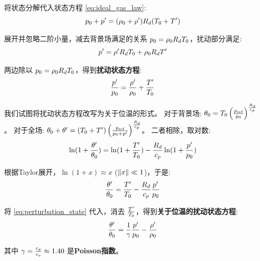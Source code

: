 将状态分解代入状态方程 \eqref{eq:ideal_gas_law}:
\begin{equation*}
    p_0 + p^\prime = (\rho_0 + \rho^\prime) R_d (T_0 + T^\prime)
\end{equation*}

展开并忽略二阶小量，减去背景场满足的关系 $p_0 = \rho_0 R_d T_0$，扰动部分满足:
\begin{equation*}
    p^\prime = \rho^\prime R_d T_0 + \rho_0 R_d T^\prime
\end{equation*}

两边除以 $p_0 = \rho_0 R_d T_0$，得到\textbf{扰动状态方程}:
\begin{equation}
    \frac{p^\prime}{p_0} = \frac{\rho^\prime}{\rho_0} + \frac{T^\prime}{T_0}
    \label{eq:perturbation_state}
\end{equation}

我们试图将扰动状态方程改写为关于位温的形式。
对于背景场: $\theta_0 = T_0 \left(\frac{p_\text{ref}}{p_0}\right)^{\frac{R_d}{c_p}}$。
对于全场: $\theta_0 + \theta^\prime = (T_0 + T^\prime) \left(\frac{p_\text{ref}}{p_0 + p^\prime}\right)^{\frac{R_d}{c_p}}$。
二者相除，取对数:
\begin{equation*}
    \ln(1 + \frac{\theta^\prime}{\theta_0}) = \ln(1 + \frac{T^\prime}{T_0}) - \frac{R_d}{c_p} \ln(1 + \frac{p^\prime}{p_0})
\end{equation*}

根据Taylor展开，$\ln(1 + x) \approx x$ ($\lVert x \rVert \ll 1$)，于是:
\begin{equation*}
    \frac{\theta^\prime}{\theta_0} = \frac{T^\prime}{T_0} - \frac{R_d}{c_p} \frac{p^\prime}{p_0}
\end{equation*}

将 \eqref{eq:perturbation_state} 代入，消去 $\frac{T^\prime}{T_0}$，得到\textbf{关于位温的扰动状态方程}:
\begin{equation}
    \frac{\theta^\prime}{\theta_0} = \frac{1}{\gamma} \frac{p^\prime}{p_0} - \frac{\rho^\prime}{\rho_0}
    \label{eq:perturbation_state_ptemp}
\end{equation}

其中 $\gamma = \frac{c_p}{c_v} \approx 1.40$ 是\textbf{Poisson指数}。

